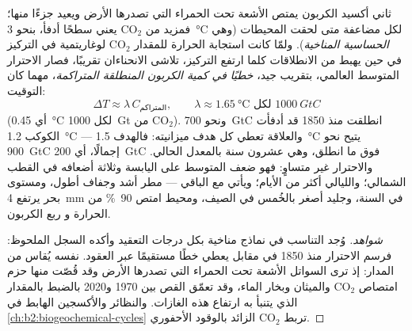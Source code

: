 \begin{proposition}\label{prop:b2:global-change:tcre}
ثاني أكسيد الكربون يمتص الأشعة تحت الحمراء التي تصدرها الأرض ويعيد
جزءًا منها؛ فمزيد من \ensuremath{\mathrm{CO_2}} يعني سطحًا أدفأ، بنحو
\qty{3}{\celsius} لكل مضاعفة متى لحقت المحيطات
(وهي \emph{الحساسية المناخية}). ولمّا كانت استجابة الحرارة
للمقدار \ensuremath{\mathrm{CO_2}} لوغاريتمية في التركيز في حين يهبط  من الانطلاقات كلما ارتفع التركيز، تلاشى
الانحناءان تقريبًا، فصار الاحترار المتوسط العالمي، بتقريب
جيد، \emph{خطيًا في كمية الكربون المنطلقة
المتراكمة}، مهما كان التوقيت:
\[
\Delta T \approx \lambda\,C_{\text{المتراكم}}, \qquad \lambda \approx
\qty{1.65}{\celsius} \text{ لكل } \qty{1000}{GtC}
\]
(أي \qty{0.45}{\celsius} لكل \qty{1000}{Gt} من \ensuremath{\mathrm{CO_2}}). ونحو
\qty{700}{GtC} انطلقت منذ 1850 قد أدفأت الكوكب
\qty{1.2}{\celsius} --- والعلاقة تعطي كل هدف
ميزانيته: فالهدف \qty{1.5}{\celsius} يتيح نحو \qty{900}{GtC} إجمالًا،
أي \qty{200}{GtC} فوق ما انطلق، وهي عشرون سنة بالمعدل
الحالي. والاحترار غير متساوٍ: فهو ضعف المتوسط على اليابسة
وثلاثة أضعافه في القطب الشمالي؛ والليالي أكثر من الأيام؛ ويأتي
مع الباقي --- مطر أشد وجفاف أطول، ومستوى بحر
يرتفع \qty{4}{mm} في السنة، وجليد أصغر بالخُمس في
الصيف، ومحيط امتص \qty{90}{\%} من الحرارة و
ربع الكربون.
\end{proposition}
\begin{proof}[شواهد]
وُجد التناسب في نماذج مناخية بكل درجات
التعقيد وأكده السجل الملحوظ: فرسم
الاحترار منذ 1850 في مقابل  يعطي خطًا مستقيمًا
عبر العقود.  نفسه يُقاس
من المدار: إذ ترى السواتل الأشعة تحت الحمراء التي تصدرها الأرض وقد قُصّت منها
حزم امتصاص \ensuremath{\mathrm{CO_2}} والميثان وبخار الماء،
وقد تعمّق القص بين 1970 و2020 بالضبط
بالمقدار الذي يتنبأ به ارتفاع هذه الغازات. والنظائر
والأكسجين الهابط في \cref{ch:b2:biogeochemical-cycles} تربط
\ensuremath{\mathrm{CO_2}} الزائد بالوقود الأحفوري.
\end{proof}

